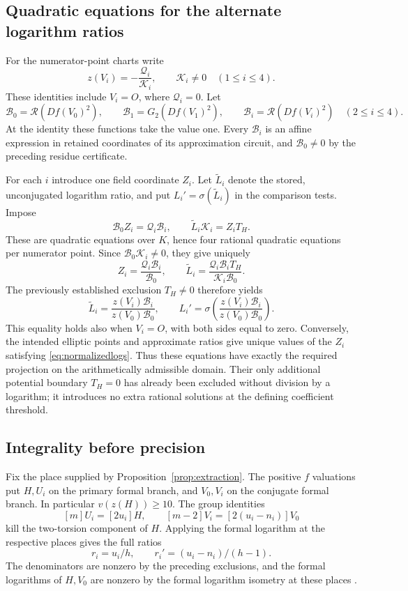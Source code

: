 \documentclass[11pt,a4paper]{article}
\theoremstyle{remark}\newtheorem{remark}[theorem]{Remark}
\begin{document}
\subsection{Quadratic equations for the alternate logarithm ratios}
For the numerator-point charts write
\[
 z(V_i)=-\frac{\mathcal Q_i}{\mathcal K_i},\qquad
 \mathcal K_i\ne0\quad(1\le i\le4).
\]
These identities include $V_i=O$, where $\mathcal Q_i=0$.
Let
\[
 \mathcal B_0=\mathcal R(Df(V_0)^2),\qquad
 \mathcal B_1=G_2(Df(V_1)^2),\qquad
 \mathcal B_i=\mathcal R(Df(V_i)^2)\quad(2\le i\le4).
\]
At the identity these functions take the value one. Every
$\mathcal B_i$ is an affine expression in retained coordinates of its
approximation circuit, and $\mathcal B_0\ne0$ by the preceding residue
certificate.

For each $i$ introduce one field coordinate $Z_i$. Let
$\widetilde L_i$ denote the stored, unconjugated logarithm ratio,
and put $L_i'=\sigma(\widetilde L_i)$ in the comparison tests.
Impose
\begin{equation}\label{eq:normalizedlogs}
             \mathcal B_0 Z_i=\mathcal Q_i \mathcal B_i,\qquad
             \widetilde L_i\mathcal K_i=Z_iT_H.
\end{equation}
These are quadratic equations over $K$, hence four rational
quadratic equations per numerator point. Since $\mathcal B_0\mathcal K_i\ne0$,
they give uniquely
\[
 Z_i=\frac{\mathcal Q_i \mathcal B_i}{\mathcal B_0},\qquad
 \widetilde L_i=\frac{\mathcal Q_i \mathcal B_iT_H}{\mathcal K_i \mathcal B_0}.
\]
The previously established exclusion $T_H\ne0$ therefore yields
\[
 \widetilde L_i=\frac{z(V_i)\mathcal B_i}{z(V_0)\mathcal B_0},\qquad
 L_i'=\sigma\!\left(\frac{z(V_i)\mathcal B_i}{z(V_0)\mathcal B_0}\right).
\]
This equality holds also when $V_i=O$, with both sides equal to zero.
Conversely, the intended elliptic points and approximate ratios give
unique values of the $Z_i$ satisfying \eqref{eq:normalizedlogs}.
Thus these equations have exactly the required projection on the
arithmetically admissible domain. Their only additional potential
boundary $T_H=0$ has already been excluded without division by a
logarithm; it introduces no extra rational solutions at the defining
coefficient threshold.

\subsection{Integrality before precision}
Fix the place supplied by Proposition~\ref{prop:extraction}. The
positive $f$ valuations put $H,U_i$ on the primary formal branch,
and $V_0,V_i$ on the conjugate formal branch. In particular
$v(z(H))\ge10$. The group identities
\[
 [m]U_i=[2u_i]H,\qquad
 [m-2]V_i=[2(u_i-n_i)]V_0
\]
kill the two-torsion component of $H$. Applying the formal logarithm
at the respective places gives the full ratios
\[
               r_i=u_i/h,\qquad r_i'=(u_i-n_i)/(h-1).
\]
The denominators are nonzero by the preceding exclusions, and the
formal logarithms of $H,V_0$ are nonzero by the formal logarithm
isometry at these places \cite[Theorem IV.6.4]{Silverman}.
\end{document}
